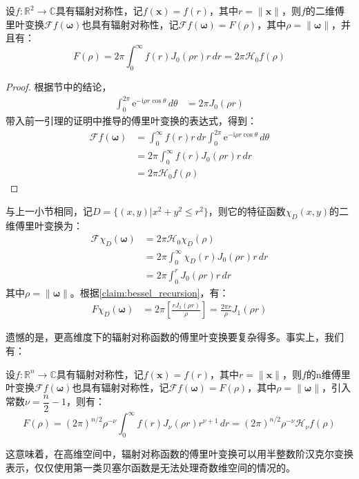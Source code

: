 \begin{theorem}
    设$f:\mathbb{R}^2\to\mathbb{C}$具有辐射对称性，记$f(\mathbf{x})=f(r)$，其中$r=\|\mathbf{x}\|$，则$f$的二维傅里叶变换$\mathcal{F} f(\boldsymbol{\omega})$也具有辐射对称性，记$\mathcal{F} f(\boldsymbol{\omega})=F(\rho)$，其中$\rho=\|\boldsymbol{\omega}\|$，并且有：
    \[F(\rho)=2\pi \int_0^{\infty}f(r)J_0(\rho r)r\,dr=2\pi\mathcal{H}_0 f(\rho)\]
\end{theorem}
\begin{proof}
    根据节中的结论，\begin{align*}
        \int_{0}^{2\pi}\mathrm{e}^{-\mathrm{i} \rho r \cos\theta}\,d\theta&=2\pi J_0(\rho r)
    \end{align*}
    带入前一引理的证明中推导的傅里叶变换的表达式，得到：
    \begin{align*}
        \mathcal{F} f(\boldsymbol{\omega})&=\int_0^{\infty}f(r)r\,dr\int_0^{2\pi}\mathrm{e}^{-\mathrm{i} \rho r \cos\theta}\,d\theta\\
        &=2\pi \int_0^{\infty}f(r)J_0(\rho r)r\,dr\\
        &=2\pi \mathcal{H} _0 f(\rho)
    \end{align*}
\end{proof}

\begin{example}[圆形特征函数的傅里叶变换]
    与上一小节相同，记$D=\{(x,y)|x^2+y^2\leq r^2\}$，则它的特征函数$\chi_D(x,y)$的二维傅里叶变换为：
    \begin{align*}
        \mathcal{F} \chi_D(\boldsymbol{\omega})&=2\pi\mathcal{H}_0 \chi_D(\rho)\\
        &=2\pi \int_0^{\infty}\chi_D(r)J_0(\rho r)r\,dr\\
        &=2\pi \int_0^{r}J_0(\rho r)r\,dr
    \end{align*}
    其中$\rho=\|\boldsymbol{\omega}\|$。根据\cref{claim:bessel_recursion}，有：
    \begin{align*}
        F\chi_D(\boldsymbol{\omega})&=2\pi \left[\frac{r J_1(\rho r)}{\rho}\right]=\frac{2\pi r}{\rho}J_1(\rho r)
    \end{align*}
\end{example}

遗憾的是，更高维度下的辐射对称函数的傅里叶变换要复杂得多。事实上，我们有：
\begin{claim}
    设$f:\mathbb{R}^n\to\mathbb{C}$具有辐射对称性，记$f(\mathbf{x})=f(r)$，其中$r=\|\mathbf{x}\|$，则$f$的n维傅里叶变换$\mathcal{F} f(\boldsymbol{\omega})$也具有辐射对称性，记$\mathcal{F} f(\boldsymbol{\omega})=F(\rho)$，其中$\rho=\|\boldsymbol{\omega}\|$，引入常数$\nu=\dfrac{n}{2}-1$，则有：
    \[F(\rho)=(2\pi)^{n/2}\rho^{-\nu}\int_0^{\infty}f(r)J_{\nu}(\rho r)r^{\nu+1}\,dr=(2\pi)^{n/2}\rho^{-\nu}\mathcal{H}_\nu f(\rho)\]
\end{claim}

这意味着，在高维空间中，辐射对称函数的傅里叶变换可以用半整数阶汉克尔变换表示，仅仅使用第一类贝塞尔函数是无法处理奇数维空间的情况的。
